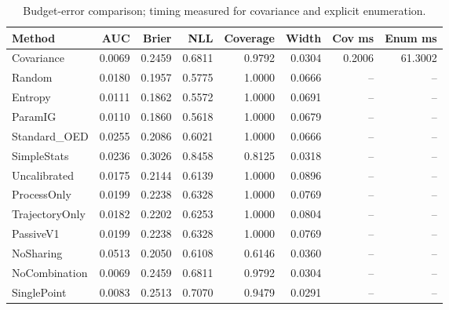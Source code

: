 \begin{table}[t]
\caption{Budget-error comparison; timing measured for covariance and explicit enumeration.}
\label{tab:experiment2}
\begin{tabular}{lrrrrrrr}
\toprule
Method & AUC & Brier & NLL & Coverage & Width & Cov ms & Enum ms \\
\midrule
Covariance & 0.0069 & 0.2459 & 0.6811 & 0.9792 & 0.0304 & 0.2006 & 61.3002 \\
Random & 0.0180 & 0.1957 & 0.5775 & 1.0000 & 0.0666 & -- & -- \\
Entropy & 0.0111 & 0.1862 & 0.5572 & 1.0000 & 0.0691 & -- & -- \\
ParamIG & 0.0110 & 0.1860 & 0.5618 & 1.0000 & 0.0679 & -- & -- \\
Standard\_OED & 0.0255 & 0.2086 & 0.6021 & 1.0000 & 0.0666 & -- & -- \\
SimpleStats & 0.0236 & 0.3026 & 0.8458 & 0.8125 & 0.0318 & -- & -- \\
Uncalibrated & 0.0175 & 0.2144 & 0.6139 & 1.0000 & 0.0896 & -- & -- \\
ProcessOnly & 0.0199 & 0.2238 & 0.6328 & 1.0000 & 0.0769 & -- & -- \\
TrajectoryOnly & 0.0182 & 0.2202 & 0.6253 & 1.0000 & 0.0804 & -- & -- \\
PassiveV1 & 0.0199 & 0.2238 & 0.6328 & 1.0000 & 0.0769 & -- & -- \\
NoSharing & 0.0513 & 0.2050 & 0.6108 & 0.6146 & 0.0360 & -- & -- \\
NoCombination & 0.0069 & 0.2459 & 0.6811 & 0.9792 & 0.0304 & -- & -- \\
SinglePoint & 0.0083 & 0.2513 & 0.7070 & 0.9479 & 0.0291 & -- & -- \\
\bottomrule
\end{tabular}
\end{table}
